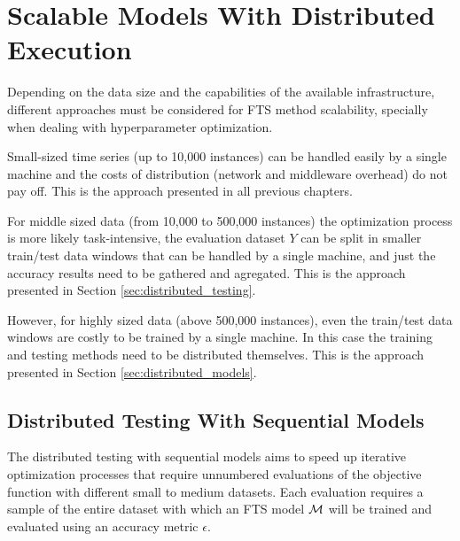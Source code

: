 \section{Scalable Models With Distributed Execution}
\label{sec:distributed}

Depending on the data size and the capabilities of the available infrastructure, different approaches must be considered for FTS method scalability, specially when dealing with hyperparameter optimization.

Small-sized time series (up to 10,000 instances) can be handled easily by a single machine and the costs of distribution (network and middleware overhead) do not pay off. This is the approach presented in all previous chapters.

For middle sized data (from 10,000 to 500,000 instances) the optimization process is more likely task-intensive, the evaluation dataset $Y$ can be split in smaller train/test data windows that can be handled by a single machine, and just the accuracy results need to be gathered and agregated. This is the approach presented in Section \ref{sec:distributed_testing}.

However, for highly sized data (above 500,000 instances), even the train/test data windows are costly to be trained by a single machine. In this case the training and testing methods need to be distributed themselves. This is the approach presented in Section \ref{sec:distributed_models}.


\subsection{Distributed Testing With Sequential Models}
\label{sec:distributed_testing}

The distributed testing with sequential models aims to speed up iterative optimization processes that require unnumbered evaluations of the objective function with different small to medium datasets. Each evaluation requires a sample of the entire dataset with which an FTS model $\mathcal{M}$ will be trained and evaluated using an accuracy metric $\epsilon$.

